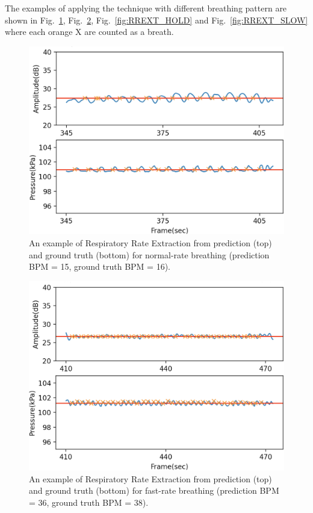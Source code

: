 \documentclass[10pt,letterpaper]{article}
\begin{document}
		The examples of applying the technique with different breathing pattern are shown in Fig.~\ref{fig:RREXT_NORMAL}, Fig.~\ref{fig:RREXT_FAST}, Fig.~\ref{fig:RREXT_HOLD} and  Fig.~\ref{fig:RREXT_SLOW} where each orange X are counted as a breath.
		
		\begin{figure}[htbp]
			\centerline{\includegraphics[width=120mm,scale=0.9]{PD2GT_NORMAL02.png}}
			\caption{An example of Respiratory Rate Extraction from prediction (top) and ground truth (bottom) for normal-rate breathing (prediction BPM = 15, ground truth BPM = 16).}
			\label{fig:RREXT_NORMAL}
		\end{figure}
	\begin{figure}[htbp]
		\centerline{\includegraphics[width=120mm,scale=0.9]{PD2GT_FAST02.png}}
		\caption{An example of Respiratory Rate Extraction from prediction (top) and ground truth (bottom) for fast-rate breathing (prediction BPM = 36, ground truth BPM = 38).}
		\label{fig:RREXT_FAST}
	\end{figure}
\end{document}
